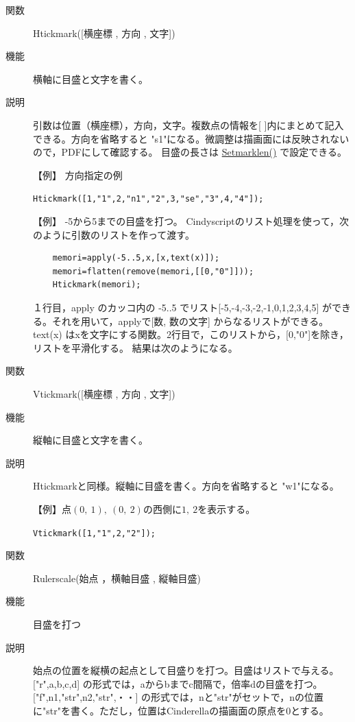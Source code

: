 \documentclass[papersize,a4paper,12pt,uplatex]{jsarticle}
\begin{document}
\begin{description}
\vspace{\baselineskip}
\hypertarget{htickmark}{}
\item[関数]  Htickmark([横座標 , 方向 , 文字])
\item[機能]  横軸に目盛と文字を書く。
\item[説明]  引数は位置（横座標），方向，文字。複数点の情報を[ ]内にまとめて記入できる。方向を省略すると "s1"になる。微調整は描画面には反映されないので，PDFにして確認する。
目盛の長さは \hyperlink{setmarklen}{Setmarklen()} で設定できる。

\vspace{\baselineskip}
【例】 方向指定の例

\hspace{10mm} \verb|Htickmark([1,"1",2,"n1","2",3,"se","3",4,"4"]);|

\vspace{\baselineskip}
\begin{center}

\end{center}

【例】  -5から5までの目盛を打つ。
  Cindyscriptのリスト処理を使って，次のように引数のリストを作って渡す。
\begin{verbatim}
    memori=apply(-5..5,x,[x,text(x)]);
    memori=flatten(remove(memori,[[0,"0"]]));
    Htickmark(memori);
\end{verbatim}
１行目，apply のカッコ内の -5..5 でリスト[-5,-4,-3,-2,-1,0,1,2,3,4,5] ができる。それを用いて，applyで[数, 数の文字] からなるリストができる。text(x) はxを文字にする関数。2行目で，このリストから，[0,"0"]を除き，リストを平滑化する。 結果は次のようになる。

\begin{center} \scalebox{0.9}{}\end{center}

\hypertarget{vtickmark}{}
\item[関数]  Vtickmark([横座標 , 方向 , 文字])
\item[機能]  縦軸に目盛と文字を書く。
\item[説明]  Htickmarkと同様。縦軸に目盛を書く。方向を省略すると "w1"になる。

\vspace{\baselineskip}
【例】点$(0,\ 1),\ (0,\ 2)$の西側に$1,\ 2$を表示する。

\hspace{10mm}  \verb|Vtickmark([1,"1",2,"2"]);|

\vspace{\baselineskip}
\hypertarget{rulerscale}{}
\item[関数]  Rulerscale(始点 ，横軸目盛 , 縦軸目盛)
\item[機能]  目盛を打つ
\item[説明]  始点の位置を縦横の起点として目盛りを打つ。目盛はリストで与える。
  ["r",a,b,c,d]  の形式では，aからbまでc間隔で，倍率dの目盛を打つ。
  ["f",n1,"str",n2,"str",・・] の形式では，nと"str"がセットで，nの位置に"str"を書く。ただし，位置はCinderellaの描画面の原点を0とする。
  

\end{description}
\end{document}
